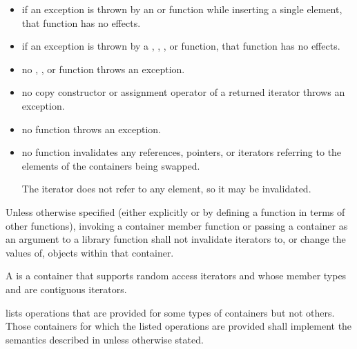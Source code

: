 \begin{itemize}
\item
if an exception is thrown by an
 or 
function while inserting a single element, that
function has no effects.
\item
if an exception is thrown by a
,
,
, or 
function, that function has no effects.
\item
no
,
,
or
function throws an exception.
\item
no copy constructor or assignment operator of a returned iterator
throws an exception.
\item
no
function throws an exception.
\item
no
function invalidates any references,
pointers, or iterators referring to the elements
of the containers being swapped. \begin{note} The  iterator does not refer to any element, so it may be invalidated. \end{note}
\end{itemize}

\pnum
Unless otherwise specified (either explicitly or by defining a
function in terms of other functions), invoking a container member
function or passing a container as an argument to a library function
shall not invalidate iterators to, or change the values of, objects
within that container.

\pnum
{}%
A 
is a container that supports random access iterators
and whose member types  and 
are contiguous iterators.

\pnum
{} lists operations that are provided
for some types of containers but not others. Those containers for which the
listed operations are provided shall implement the semantics described in
 unless otherwise stated.

